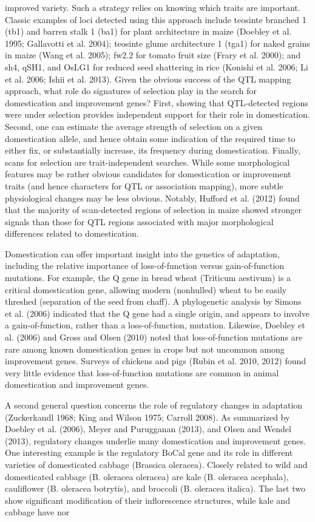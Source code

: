 \documentclass{article}
\begin{document}
improved variety. Such a strategy relies on knowing which traits are important. Classic examples of loci detected using this approach include teosinte branched 1 (tb1) and barren stalk 1 (ba1) for plant architecture in maize (Doebley et al. 1995; Gallavotti et al. 2004); teosinte glume architecture 1 (tga1) for naked grains in maize (Wang et al. 2005); fw2.2 for tomato fruit size (Frary et al. 2000); and sh4, qSH1, and OsLG1 for reduced seed shattering in rice (Konishi et al. 2006; Li et al. 2006; Ishii et al. 2013). Given the obvious success of the QTL mapping approach, what role do signatures of selection play in the search for domestication and improvement genes? First, showing that QTL-detected regions were under selection provides independent support for their role in domestication. Second, one can estimate the average strength of selection on a given domestication allele, and hence obtain some indication of the required time to either fix, or substantially increase, its frequency during domestication. Finally, scans for selection are trait-independent searches. While some morphological features may be rather obvious candidates for domestication or improvement traits (and hence characters for QTL or association mapping), more subtle physiological changes may be less obvious. Notably, Hufford et al. (2012) found that the majority of scan-detected regions of selection in maize showed stronger signals than those for QTL regions associated with major morphological differences related to domestication.

Domestication can offer important insight into the genetics of adaptation, including the relative importance of loss-of-function versus gain-of-function mutations. For example, the Q gene in bread wheat (Triticum aestivum) is a critical domestication gene, allowing modern (nonhulled) wheat to be easily threshed (separation of the seed from chaff). A phylogenetic analysis by Simons et al. (2006) indicated that the Q gene had a single origin, and appears to involve a gain-of-function, rather than a loss-of-function, mutation. Likewise, Doebley et al. (2006) and Gross and Olsen (2010) noted that loss-of-function mutations are rare among known domestication genes in crops but not uncommon among improvement genes. Surveys of chickens and pigs (Rubin et al. 2010, 2012) found very little evidence that loss-of-function mutations are common in animal domestication and improvement genes.

A second general question concerns the role of regulatory changes in adaptation (Zuckerkandl 1968; King and Wilson 1975; Carroll 2008). As summarized by Doebley et al. (2006), Meyer and Purugganan (2013), and Olsen and Wendel (2013), regulatory changes underlie many domestication and improvement genes. One interesting example is the regulatory BoCal gene and its role in different varieties of domesticated cabbage (Brassica oleracea). Closely related to wild and domesticated cabbage (B. oleracea oleracea) are kale (B. oleracea acephala), cauliflower (B. oleracea botrytis), and broccoli (B. oleracea italica). The last two show significant modification of their inflorescence structures, while kale and cabbage have nor
\end{document}
